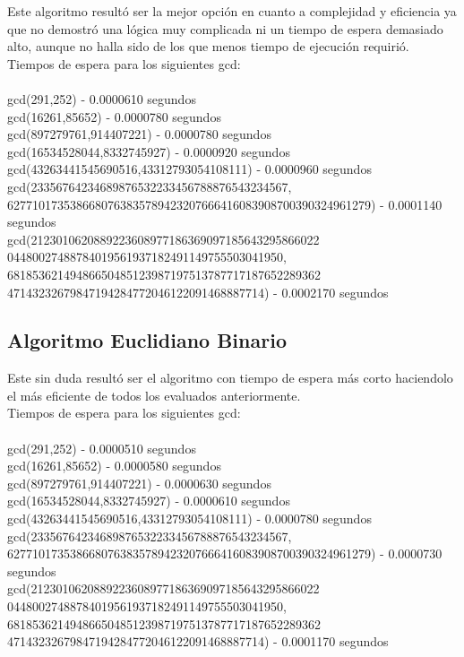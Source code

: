 \documentclass[12pt,letterpaper]{scrartcl}
\begin{document}
Este algoritmo resultó ser la mejor opción en cuanto a complejidad y eficiencia ya que no demostró una lógica muy complicada ni un tiempo de espera demasiado alto, aunque no halla sido de los que menos tiempo de ejecución requirió.
\\
Tiempos de espera para los siguientes gcd:
\\\\
gcd(291,252) - 0.0000610 segundos
\\
gcd(16261,85652) - 0.0000780 segundos
\\
gcd(897279761,914407221) - 0.0000780 segundos
\\
gcd(16534528044,8332745927) - 0.0000920 segundos
\\
gcd(43263441545690516,43312793054108111) - 0.0000960 segundos
\\
gcd(23356764234689876532233456788876543234567,\\
6277101735386680763835789423207666416083908700390324961279) - 0.0001140 segundos
\\
gcd(2123010620889223608977186369097185643295866022\\04480027488784019561937182491149755503041950,\\
68185362149486650485123987197513787717187652289362\\47143232679847194284772046122091468887714) - 0.0002170 segundos


\newpage

\subsection{Algoritmo Euclidiano Binario}

Este sin duda resultó ser el algoritmo con tiempo de espera más corto haciendolo el más eficiente de todos los evaluados anteriormente.
\\
Tiempos de espera para los siguientes gcd:
\\\\
gcd(291,252) - 0.0000510 segundos
\\
gcd(16261,85652) - 0.0000580 segundos
\\
gcd(897279761,914407221) - 0.0000630 segundos
\\
gcd(16534528044,8332745927) - 0.0000610 segundos
\\
gcd(43263441545690516,43312793054108111) - 0.0000780 segundos
\\
gcd(23356764234689876532233456788876543234567,\\
6277101735386680763835789423207666416083908700390324961279) - 0.0000730 segundos
\\
gcd(2123010620889223608977186369097185643295866022\\04480027488784019561937182491149755503041950,\\
68185362149486650485123987197513787717187652289362\\47143232679847194284772046122091468887714) - 0.0001170 segundos
\end{document}

